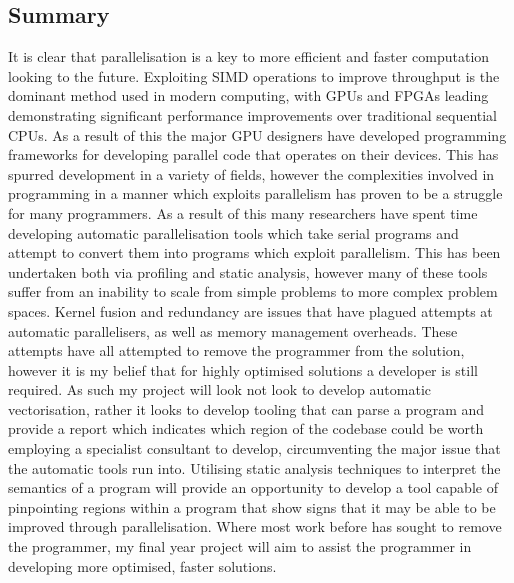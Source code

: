 \subsection{Summary}
It is clear that parallelisation is a key to more efficient and faster computation looking to the
future. Exploiting SIMD operations to improve throughput is the dominant method used in modern
computing, with GPUs and FPGAs leading demonstrating significant performance improvements over
traditional sequential CPUs. As a result of this the major GPU designers have developed programming
frameworks for developing parallel code that operates on their devices. This has spurred development
in a variety of fields, however the complexities involved in programming in a manner which exploits
parallelism has proven to be a struggle for many programmers. As a result of this many researchers
have spent time developing automatic parallelisation tools which take serial programs and attempt to
convert them into programs which exploit parallelism. This has been undertaken both via profiling
and static analysis, however many of these tools suffer from an inability to scale from simple
problems to more complex problem spaces. Kernel fusion and redundancy are issues that have plagued
attempts at automatic parallelisers, as well as memory management overheads. These attempts have all
attempted to remove the programmer from the solution, however it is my belief that for highly
optimised solutions a developer is still required. As such my project will look not look to develop
automatic vectorisation, rather it looks to develop tooling that can parse a program and provide a
report which indicates which region of the codebase could be worth employing a specialist consultant
to develop, circumventing the major issue that the automatic tools run into. Utilising static
analysis techniques to interpret the semantics of a program will provide an opportunity to develop a
tool capable of pinpointing regions within a program that show signs that it may be able to be
improved through parallelisation. Where most work before has sought to remove the programmer, my
final year project will aim to assist the programmer in developing more optimised, faster solutions.
